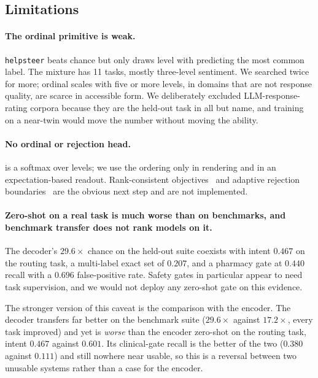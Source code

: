 \subsection{Limitations}

\paragraph{The ordinal primitive is weak.} \texttt{helpsteer} beats chance
but only draws level with predicting the most common label. The mixture
has 11 \score{} tasks, mostly three-level sentiment. We searched twice for
more; ordinal scales with five or more levels, in domains that are not
response quality, are scarce in accessible form. We deliberately excluded
LLM-response-rating corpora because they are the held-out task in all but
name, and training on a near-twin would move the number without moving the
ability.

\paragraph{No ordinal or rejection head.} \score{} is a softmax over
levels; we use the ordering only in rendering and in an expectation-based
readout. Rank-consistent objectives~\cite{corn} and adaptive rejection
boundaries~\cite{adb} are the obvious next step and are not implemented.

\paragraph{Zero-shot on a real task is much worse than on benchmarks, and
benchmark transfer does not rank models on it.} The decoder's
$29.6\times$ chance on the held-out suite coexists with intent $0.467$ on
the routing task, a multi-label exact set of $0.207$, and a pharmacy gate
at $0.440$ recall with a $0.696$ false-positive rate. Safety gates in
particular appear to need task supervision, and we would not deploy any
zero-shot gate on this evidence.

The stronger version of this caveat is the comparison with the encoder.
The decoder transfers far better on the benchmark suite ($29.6\times$
against $17.2\times$, every task improved) and yet is \emph{worse} than
the encoder zero-shot on the routing task, intent $0.467$ against
$0.601$. Its clinical-gate recall is the better of the two ($0.380$
against $0.111$) and still nowhere near usable, so this is a reversal
between two unusable systems rather than a case for the encoder.

